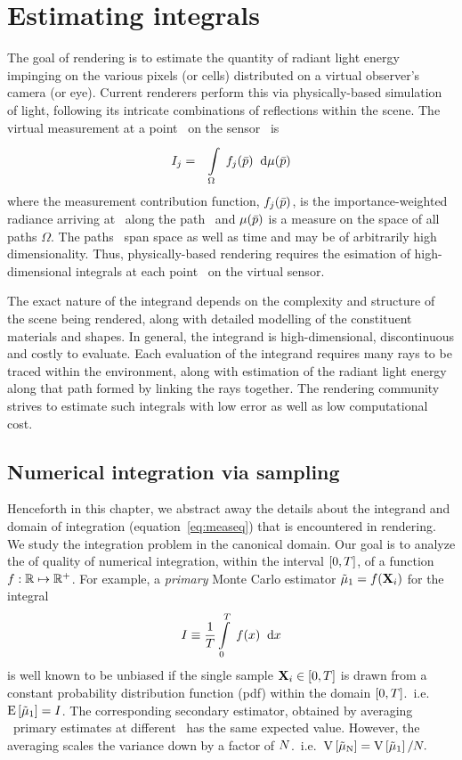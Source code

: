 \documentclass[11pt,fleqn]{book} %
\begin{document}
\chapter{Estimating integrals}
The goal of rendering is to estimate the quantity of radiant light energy impinging on the various pixels (or cells) distributed on a virtual observer's camera (or eye). Current renderers perform this via physically-based simulation of light, following its intricate combinations of reflections within the scene. The virtual measurement \Ij {\xs} at a point \xs\  on the sensor~\cite{VeachChapter8} is
\begin{eqnarray} \label{eq:measeq}
 I_{j} & = & \displaystyle\int\limits_{\Omega}^{} \; f_{j}(\bar{p}) \;\; \mathrm{d}\mu(\bar{p})
\end{eqnarray}
where the measurement contribution function, $f_{j}(\bar{p})$, is the importance-weighted radiance arriving at \xs\ along the path \pth\ and $\mu(\bar{p})$ is a measure on the space of all paths $\Omega$. The paths \pth\ span space as well as time and may be of arbitrarily high dimensionality. Thus, physically-based rendering requires the esimation of high-dimensional integrals at each point \xs\ on the virtual sensor. 

The exact nature of the integrand depends on the complexity and structure of the scene being rendered, along with detailed modelling of the constituent materials and shapes.  In general, the integrand is high-dimensional, discontinuous and costly to evaluate. Each evaluation of the integrand requires many rays to be traced within the environment, along with estimation of the radiant light energy along that path formed by linking the rays together. 
The rendering community strives to estimate such integrals with low error as well as low computational cost.


\section{Numerical integration via sampling}
Henceforth in this chapter, we abstract away the details about the integrand and domain of integration (equation~\ref{eq:measeq}) that is encountered in rendering. We study the integration problem in the canonical domain.  
Our goal is to analyze the of quality of numerical integration, within the interval $[0,T]$, of a function $f: \mathbb{R} \mapsto \mathbb{R}^{+}$. 
For example, a \textit{primary} Monte Carlo estimator $\tilde\mu_\mathrm{1} = f(\mathbf{X} _i)$ for the integral
$$I \equiv \frac 1 {T} \displaystyle\int\limits_{0}^{T} \; f(x)  \;\; \mathrm{d}x $$
is well known to be unbiased if the  single sample $\mathbf{X} _i \in [0,T] $ is drawn from a constant probability distribution function (pdf) within the domain $[0,T]$.~i.e.~$\mathrm{E} \left[\tilde\mu_\mathrm{1} \right] = I$.
The corresponding secondary estimator, obtained by averaging \N\ primary estimates at different \xii\ has the same expected value. However, the averaging scales the variance down by a factor of $N$.~i.e.~$\mathrm{V} \left[\tilde\mu_\mathrm{N}\right] = \mathrm{V} \left[\tilde\mu_\mathrm{1}\right]/N.$ 
\end{document}
